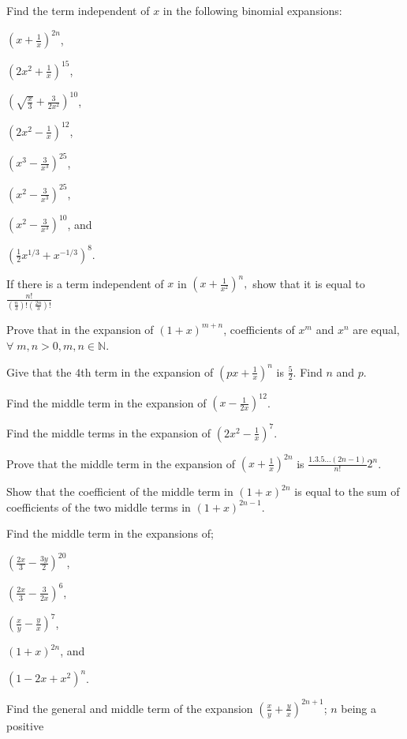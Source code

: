 \item Find the term independent of $x$ in the following binomial expansions:
  \startitemize[n]
  \item $\left(x + \frac{1}{x}\right)^{2n}$,
  \item $\left(2x^2 + \frac{1}{x}\right)^{15}$,
  \item $\left(\sqrt{\frac{x}{3}} + \frac{3}{2x^2}\right)^{10}$,
  \item $\left(2x^2 - \frac{1}{x}\right)^{12}$,
  \item $\left(x^3 - \frac{3}{x^3}\right)^{25}$,
  \item $\left(x^2 - \frac{3}{x^3}\right)^{25}$,
  \item $\left(x^2 - \frac{3}{x^3}\right)^{10}$, and
  \item $\left(\frac{1}{2}x^{1/3} + x^{-1/3}\right)^8$.
  \stopitemize
\item If there is a term independent of $x$ in $\left(x + \frac{1}{x^2}\right)^n,$ show that it is equal to
  $\frac{n!}{\left(\frac{n}{3}\right)!\left(\frac{2n}{3}\right)!}$
\item Prove that in the expansion of $(1 + x)^{m + n}$, coefficients of $x^m$ and $x^n$ are equal, $\forall\;m,n > 0,m,
  n\in\mathbb{N}$.
\item Give that the $4$th term in the expansion of $\left(px + \frac{1}{x}\right)^n$ is $\frac{5}{2}$. Find $n$ and $p$.
\item Find the middle term in the expansion of $\left(x - \frac{1}{2x}\right)^{12}$.
\item Find the middle terms in the expansion of $\left(2x^2 - \frac{1}{x}\right)^7$.
\item Prove that the middle term in the expansion of $\left(x + \frac{1}{x}\right)^{2n}$ is $\frac{1.3.5\ldots(2n - 1)}{n!}2^n$.
\item Show that the coefficient of the middle term in $(1 + x)^{2n}$ is equal to the sum of coefficients of the two middle terms in
  $(1 + x)^{2n - 1}$.
\item Find the middle term in the expansions of;
  \startitemize[n]
  \item $\left(\frac{2x}{3} - \frac{3y}{2}\right)^{20}$,
  \item $\left(\frac{2x}{3} - \frac{3}{2x}\right)^6$,
  \item $\left(\frac{x}{y} - \frac{y}{x}\right)^7$,
  \item $(1 + x)^{2n}$, and
  \item $(1 - 2x + x^2)^n$.
  \stopitemize
\item Find the general and middle term of the expansion $\left(\frac{x}{y} + \frac{y}{x}\right)^{2n + 1}$; $n$ being a positive
